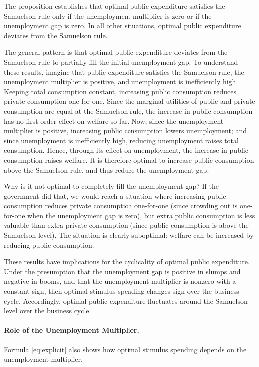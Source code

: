\documentclass[letterpaper,12pt,leqno]{article}
\begin{document}
\begin{bibunit}
The proposition establishes that optimal public expenditure satisfies the Samuelson rule only if the unemployment multiplier is zero or if the unemployment gap is zero. In all other situations, optimal public expenditure deviates from the Samuelson rule. 

The general pattern is that optimal public expenditure deviates from the Samuelson rule to partially fill the initial unemployment gap. To understand these results, imagine that public expenditure satisfies the Samuelson rule, the unemployment multiplier is positive, and unemployment is inefficiently high. Keeping total consumption constant, increasing public consumption reduces private consumption one-for-one. Since the marginal utilities of public and private consumption are equal at the Samuelson rule, the increase in public consumption has no first-order effect on welfare so far. Now, since the unemployment multiplier is positive, increasing public consumption lowers unemployment; and since unemployment is inefficiently high, reducing unemployment raises total consumption. Hence, through its effect on unemployment, the increase in public consumption raises welfare. It is therefore optimal to increase public consumption above the Samuelson rule, and thus reduce the unemployment gap.

Why is it not optimal to completely fill the unemployment gap? If the government did that, we would reach a situation where increasing public consumption reduces private consumption one-for-one (since crowding out is one-for-one when the unemployment gap is zero), but extra public consumption is less valuable than extra private consumption (since public consumption is above the Samuelson level). The situation is clearly suboptimal: welfare can be increased by reducing public consumption.

These results have implications for the cyclicality of optimal public expenditure. Under the presumption that the unemployment gap is positive in slumps and negative in booms, and that the unemployment multiplier is nonzero with a constant sign, then optimal stimulus spending changes sign over the business cycle. Accordingly, optimal public expenditure fluctuates around the Samuelson level over the business cycle.

\paragraph{Role of the Unemployment Multiplier.} Formula \eqref{eq:explicit} also shows how optimal stimulus spending depends on the unemployment multiplier.


\end{bibunit}
\end{document}
